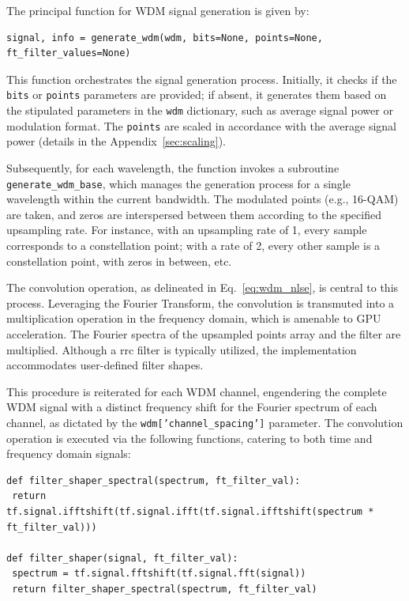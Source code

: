 The principal function for WDM signal generation is given by:
\begin{lstlisting}
signal, info = generate_wdm(wdm, bits=None, points=None, ft_filter_values=None)
\end{lstlisting}
This function orchestrates the signal generation process. Initially, it checks if the \texttt{bits} or \texttt{points} parameters are provided; if absent, it generates them based on the stipulated parameters in the \texttt{wdm} dictionary, such as average signal power or modulation format. The \texttt{points} are scaled in accordance with the average signal power (details in the Appendix~\ref{sec:scaling}).

Subsequently, for each wavelength, the function invokes a subroutine \texttt{generate\_wdm\_base},
which manages the generation process for a single wavelength within the current bandwidth. The modulated points (e.g., 16-QAM) are taken, and zeros are interspersed between them according to the specified upsampling rate. For instance, with an upsampling rate of 1, every sample corresponds to a constellation point; with a rate of 2, every other sample is a constellation point, with zeros in between, etc.

The convolution operation, as delineated in Eq.~\ref{eq:wdm_nlse}, is central to this process. Leveraging the Fourier Transform, the convolution is transmuted into a multiplication operation in the frequency domain, which is amenable to GPU acceleration. The Fourier spectra of the upsampled points array and the filter are multiplied. Although a \Gls{rrc} filter is typically utilized, the implementation accommodates user-defined filter shapes.

This procedure is reiterated for each WDM channel, engendering the complete WDM signal with a distinct frequency shift for the Fourier spectrum of each channel, as dictated by the \texttt{wdm['channel\_spacing']} parameter. The convolution operation is executed via the following functions, catering to both time and frequency domain signals:
\begin{lstlisting}
def filter_shaper_spectral(spectrum, ft_filter_val):
 return tf.signal.ifftshift(tf.signal.ifft(tf.signal.ifftshift(spectrum * ft_filter_val)))

def filter_shaper(signal, ft_filter_val):
 spectrum = tf.signal.fftshift(tf.signal.fft(signal))
 return filter_shaper_spectral(spectrum, ft_filter_val)
\end{lstlisting}

